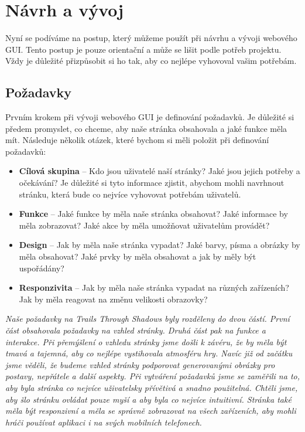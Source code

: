 \section{Návrh a vývoj}
\label{sec:design-and-development}

Nyní se podíváme na postup, který můžeme použít při návrhu a vývoji webového GUI. Tento postup je pouze orientační a může se lišit podle potřeb projektu. Vždy je důležité přizpůsobit si ho tak, aby co nejlépe vyhovoval vašim potřebám.

\subsection{Požadavky}
\label{subsec:requirements}

Prvním krokem při vývoji webového GUI je definování požadavků. Je důležité si předem promyslet, co chceme, aby naše stránka obsahovala a jaké funkce měla mít. Následuje několik otázek, které bychom si měli položit při definování požadavků:

\begin{itemize}
  \item \textbf{Cílová skupina} -- Kdo jsou uživatelé naší stránky? Jaké jsou jejich potřeby a očekávání? Je důležité si tyto informace zjistit, abychom mohli navrhnout stránku, která bude co nejvíce vyhovovat potřebám uživatelů.
  \item \textbf{Funkce} -- Jaké funkce by měla naše stránka obsahovat? Jaké informace by měla zobrazovat? Jaké akce by měla umožňovat uživatelům provádět?
  \item \textbf{Design} -- Jak by měla naše stránka vypadat? Jaké barvy, písma a obrázky by měla obsahovat? Jaké prvky by měla obsahovat a jak by měly být uspořádány?
  \item \textbf{Responzivita} -- Jak by měla naše stránka vypadat na různých zařízeních? Jak by měla reagovat na změnu velikosti obrazovky?
\end{itemize}

\textit{Naše požadavky na Trails Through Shadows byly rozděleny do dvou částí. První část obsahovala požadavky na vzhled stránky. Druhá část pak na funkce a interakce. Při přemýšlení o vzhledu stránky jsme došli k závéru, že by měla být tmavá a tajemná, aby co nejlépe vystihovala atmosféru hry. Navíc již od začátku jsme věděli, že budeme vzhled stránky podporovat generovanými obrázky pro postavy, nepřátele a další aspekty. Při vytváření požadavků jsme se zaměřili na to, aby byla stránka co nejvíce uživatelsky přívětivá a snadno použitelná. Chtěli jsme, aby šlo stránku ovládat pouze myší a aby byla co nejvíce intuitivní. Stránka také měla být responzivní a měla se správně zobrazovat na všech zařízeních, aby mohli hráči používat aplikaci i na svých mobilních telefonech.}

